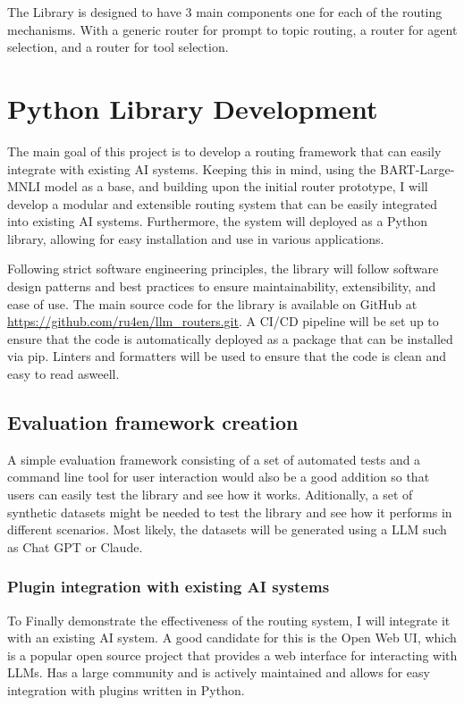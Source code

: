 The Library is designed to have 3 main components one for each of the routing mechanisms. With a generic router for prompt to topic routing, a router for agent selection, and a router for tool selection.

\section{Python Library Development}
\label{sec:router_dev}

The main goal of this project is to develop a routing framework that can easily integrate with existing AI systems. Keeping this in mind, using the BART-Large-MNLI model as a base, and building upon the initial router prototype, I will develop a modular and extensible routing system that can be easily integrated into existing AI systems. Furthermore, the system will deployed as a Python library, allowing for easy installation and use in various applications.

Following strict software engineering principles, the library will follow software design patterns and best practices to ensure maintainability, extensibility, and ease of use. The main source code for the library is available on GitHub at \url{https://github.com/ru4en/llm_routers.git}. A CI/CD pipeline will be set up to ensure that the code is automatically deployed as a package that can be installed via pip. Linters and formatters will be used to ensure that the code is clean and easy to read asweell.


\subsection{Evaluation framework creation}
\label{sec:evaluation_framework}

A simple evaluation framework consisting of a set of automated tests and a command line tool for user interaction would also be a good addition so that users can easily test the library and see how it works. Aditionally, a set of synthetic datasets might be needed to test the library and see how it performs in different scenarios. Most likely, the datasets will be generated using a LLM such as Chat GPT or Claude.

\subsubsection{Plugin integration with existing AI systems}
\label{sec:plugin_integration}

To Finally demonstrate the effectiveness of the routing system, I will integrate it with an existing AI system. A good candidate for this is the Open Web UI, which is a popular open source project that provides a web interface for interacting with LLMs. Has a large community and is actively maintained and allows for easy integration with plugins written in Python.

